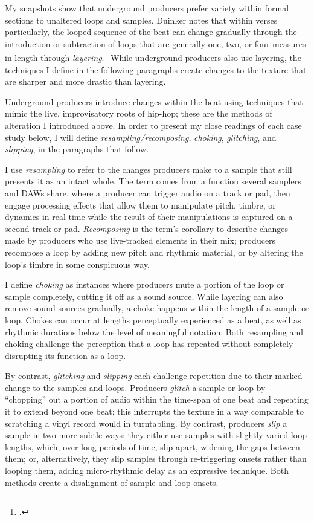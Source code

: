 My snapshots show that underground producers prefer variety within formal sections to unaltered
loops and samples. Duinker notes that within verses particularly, the looped sequence of the beat
can change gradually through the introduction or subtraction of loops that are generally one, two,
or four measures in length through \emph{layering}.\footnote{
    \cite[96]{benduinkerSongFormMainstreaming2020}.} 
While underground producers also use layering, the techniques I define in the following
paragraphs create changes to the texture that are sharper and more drastic than layering.

Underground producers introduce changes within the beat using techniques that mimic the 
live, improvisatory roots of hip-hop; these are the methods of alteration I introduced 
above.  In order to present my close readings of each case study below, I will define 
\emph{resampling/recomposing}, \emph{choking}, \emph{glitching}, and \emph{slipping}, 
in the paragraphs that follow.

I use \emph{resampling} to refer to the changes producers make to a sample that still presents it 
as an intact whole. The term comes from a function several samplers and DAWs share, where a producer
can trigger audio on a track or pad, then engage processing effects that allow them to manipulate 
pitch, timbre, or dynamics in real time while the result of their manipulations is captured on a
second track or pad. \textit{Recomposing} is the term's corollary to describe changes made by
producers who use live-tracked elements in their mix; producers recompose a loop by adding new
pitch and rhythmic material, or by altering the loop's timbre in some conspicuous way.

I define \emph{choking} as instances where producers mute a portion of the loop or sample
completely, cutting it off as a sound source. While layering can also remove sound sources
gradually, a choke happens within the length of a sample or loop. Chokes can occur at lengths
perceptually experienced as a beat, as well as rhythmic durations below the level of meaningful
notation. Both resampling and choking challenge the perception that a loop has repeated without
completely disrupting its function as a loop.

\label{glitch}
By contrast, \emph{glitching} and \emph{slipping} each challenge repetition due to their marked 
change to the samples and loops. Producers \emph{glitch} a sample or loop by ``chopping'' out
a portion of audio within the time-span of one beat and repeating it to extend beyond one beat; 
this interrupts the texture in a way comparable to scratching a vinyl record would in turntabling. 
By contrast, producers \emph{slip} a sample in two more subtle ways: they either use samples with
slightly varied loop lengths, which, over long periods of time, slip apart, widening the gaps
between them; or, alternatively, they slip samples through re-triggering onsets rather than
looping them, adding micro-rhythmic delay as an expressive technique. Both methods create a 
disalignment of sample and loop onsets.

